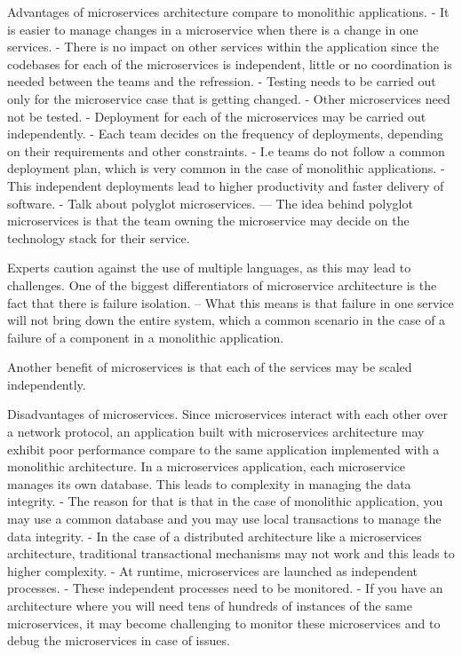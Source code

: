 Advantages of microservices architecture compare to monolithic applications.
- It is easier to manage changes in a microservice when there is a change in one services.
- There is no impact on other services within the application since the codebases for each of the microservices is independent, little or no coordination is needed between the teams and the refression.
- Testing needs to be carried out only for the microservice case that is getting changed.
- Other microservices need not be tested.
- Deployment for each of the microservices may be carried out independently.
- Each team decides on the frequency of deployments, depending on their requirements and other constraints.
- I.e teams do not follow a common deployment plan, which is very common in the case of monolithic applications.
- This independent deployments lead to higher productivity and faster delivery of software.
- Talk about polyglot microservices.
--- The idea behind polyglot microservices is that the team owning the microservice may decide on the technology stack for their service.

Experts caution against the use of multiple languages, as this may lead to challenges.
One of the biggest differentiators of microservice architecture is the fact that there is failure isolation.
-- What this means is that failure in one service will not bring down the entire system, which a common scenario in the case of a failure of a component in a monolithic application.

Another benefit of microservices is that each of the services may be scaled independently.

Disadvantages of microservices.
Since microservices interact with each other over a network protocol, an application built with microservices architecture may exhibit poor performance compare to the same application implemented with a monolithic architecture.
In a microservices application, each microservice manages its own database.
This leads to complexity in managing the data integrity.
- The reason for that is that in the case of monolithic application, you may use a common database and you may use local transactions to manage the data integrity.
- In the case of a distributed architecture like a microservices architecture, traditional transactional mechanisms may not work and this leads to higher complexity.
- At runtime, microservices are launched as independent processes.
- These independent processes need to be monitored.
- If you have an architecture where you will need tens of hundreds of instances of the same microservices, it may become challenging to monitor these microservices and to debug the microservices in case of issues.

